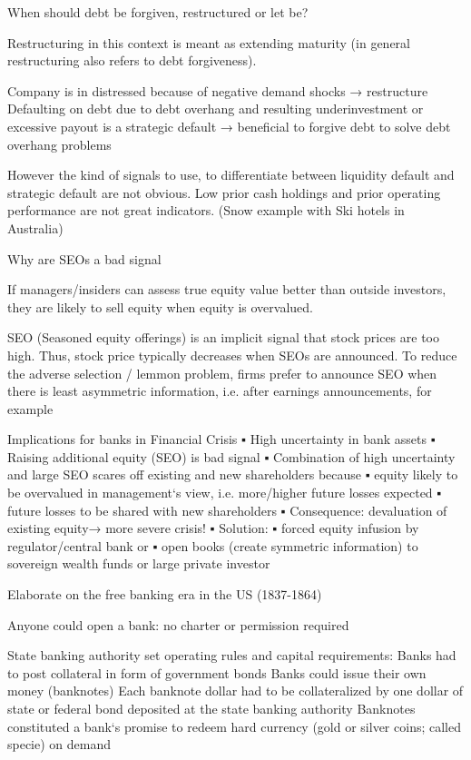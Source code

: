 When should debt be forgiven, restructured or let be?

Restructuring in this context is meant as extending maturity (in general restructuring
also refers to debt forgiveness).

Company is in distressed because of negative demand shocks
→ restructure
Defaulting on debt due to debt overhang and resulting
underinvestment or excessive payout is a strategic default
→ beneficial to forgive debt to solve debt overhang problems

However the kind of signals to use, to differentiate between liquidity default and strategic default
are not obvious.
Low prior cash holdings and prior operating performance are not great indicators.
(Snow example with Ski hotels in Australia)


Why are SEOs a bad signal

If managers/insiders can assess true equity value better than
outside investors, they are likely to sell equity when equity is
overvalued.

SEO (Seasoned equity offerings) is an implicit signal that stock prices are too high.
Thus, stock price typically decreases when SEOs are
announced.
To reduce the adverse selection / lemmon problem, firms
prefer to announce SEO when there is least asymmetric
information, i.e. after earnings announcements, for example

Implications for banks in Financial Crisis
▪ High uncertainty in bank assets
▪ Raising additional equity (SEO) is bad signal
▪ Combination of high uncertainty and large SEO scares off existing
and new shareholders because
▪ equity likely to be overvalued in management‘s view, i.e.
more/higher future losses expected
▪ future losses to be shared with new shareholders
▪ Consequence: devaluation of existing equity→ more severe crisis!
▪ Solution:
▪ forced equity infusion by regulator/central bank or
▪ open books (create symmetric information) to sovereign
wealth funds or large private investor

Elaborate on the free banking era in the US (1837-1864)

Anyone could open a bank: no charter or permission required

State banking authority set operating rules and capital
requirements:
Banks had to post collateral in form of government bonds
Banks could issue their own money (banknotes)
Each banknote dollar had to be collateralized by one dollar
of state or federal bond deposited at the state banking
authority
Banknotes constituted a bank‘s promise to redeem hard
currency (gold or silver coins; called specie) on demand

